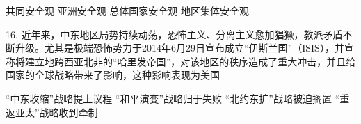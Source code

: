 \begin{choices}
	 共同安全观
	 亚洲安全观
	 总体国家安全观
	 地区集体安全观
\end{choices}
16. 近年来，中东地区局势持续动荡，恐怖主义、分离主义愈加猖獗，教派矛盾不断升级。尤其是极端恐怖势力于2014年6月29日宣布成立“伊斯兰国”（ISIS），并宣称将建立地跨西亚北非的“哈里发帝国”，对该地区的秩序造成了重大冲击，并且给国家的全球战略带来了影响，这种影响表现为美国
\begin{choices}
	 “中东收缩”战略提上议程
	 “和平演变”战略归于失败
	 “北约东扩”战略被迫搁置
	 “重返亚太”战略收到牵制
\end{choices}
\vspace{6pt}
